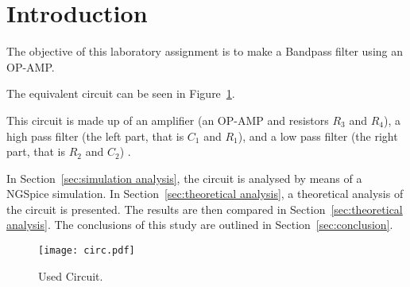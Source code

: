 \section{Introduction}
\label{sec:introduction}

\indent

The objective of this laboratory assignment is to make a Bandpass filter using an OP-AMP.

The equivalent circuit can be seen in Figure~\ref{fig:circuit}. 

This circuit is made up of an amplifier (an OP-AMP and resistors $R_3$ and $R_4$), a high pass filter (the left part, that is $C_1$ and $R_1$),  and a low pass filter (the right part, that is $R_2$ and $C_2$) .

In Section~\ref{sec:simulation analysis}, the circuit is analysed by
means of a NGSpice simulation. In Section~\ref{sec:theoretical analysis}, a theoretical analysis of the circuit is
presented. The results are then compared in Section~\ref{sec:theoretical analysis}. The conclusions of this study are outlined in Section~\ref{sec:conclusion}.



\begin{figure}[h!] \centering
	\texttt{[image: circ.pdf]}
	\caption{Used Circuit.}
	\label{fig:circuit}
\end{figure}





